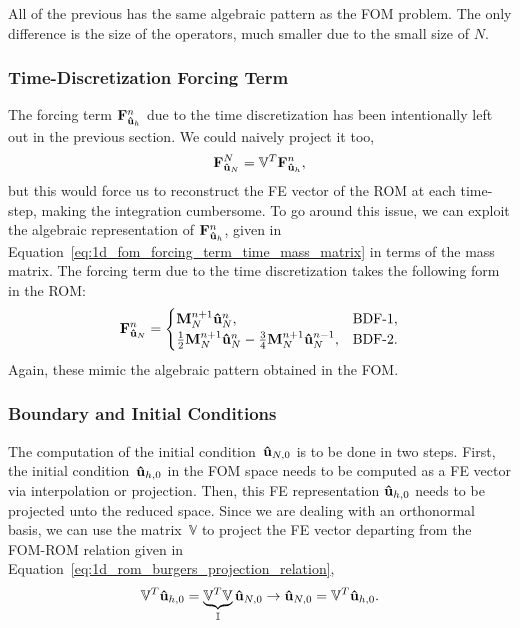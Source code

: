 \documentclass[../../thesis.tex]{subfiles}
\newcommand{\rbV}{\ensuremath{\mathbb{V}}}
\newcommand{\rbVT}{\ensuremath{\rbV^T}}
\begin{document}
All of the previous has the same algebraic pattern as the FOM problem.
The only difference is the size of the operators, much smaller due to the small size of $N$. 

\subsubsection*{Time-Discretization Forcing Term}
The forcing term $\vb{F}_{\vb{\hat{u}}_h}^{n}$ due to the time discretization has been intentionally left out in the previous section.
We could naively project it too, 
\begin{equation}
    \vb{F}_{\vb{\hat{u}}_N}^{N} = \rbVT \vb{F}_{\vb{\hat{u}}_h}^{n},
\end{equation}
but this would force us to reconstruct the FE vector of the ROM at each time-step, making the integration cumbersome.
To go around this issue, we can exploit the algebraic representation of $\vb{F}_{\vb{\hat{u}}_h}^{n}$, 
given in Equation~\eqref{eq:1d_fom_forcing_term_time_mass_matrix} in terms of the mass matrix. 
The forcing term due to the time discretization takes the following form in the ROM:
\begin{equation}
    \vb{F}_{\vb{\hat{u}}_N}^{n} = 
    \begin{cases}
        \vb{M}_{N}^{n+1} \vb{\hat{u}}_{N}^{n},                & \text{BDF-1},
        \\
        \frac{1}{2}\vb{M}_{N}^{n+1} \vb{\hat{u}}_{N}^{n}
        - \frac{3}{4}\vb{M}_{N}^{n+1} \vb{\hat{u}}_{N}^{n-1}, & \text{BDF-2}.
    \end{cases}
\end{equation}
Again, these mimic the algebraic pattern obtained in the FOM.

\subsubsection{Boundary and Initial Conditions}
The computation of the initial condition~$\vb{\hat{u}}_{N,0}$ is to be done in two steps. 
First, the initial condition~$\vb{\hat{u}}_{h,0}$ in the FOM space needs to be computed as a FE vector via interpolation or projection.
Then, this FE representation $\vb{\hat{u}}_{h,0}$ needs to be projected unto the reduced space. 
Since we are dealing with an orthonormal basis, we can use the matrix~$\rbV$ to project the FE vector departing from the \mbox{FOM-ROM} relation given in Equation~\eqref{eq:1d_rom_burgers_projection_relation},
\begin{equation}
    \rbVT \vb{\hat{u}}_{h,0} = \underbrace{\rbVT \rbV}_{\mathbb{I}} \vb{\hat{u}}_{N,0} 
    \rightarrow 
    \vb{\hat{u}}_{N,0} = \rbVT \vb{\hat{u}}_{h,0}.
\end{equation}
\end{document}
